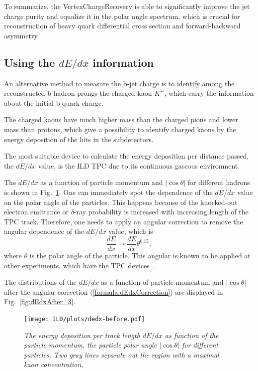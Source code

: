 To summarize, the VertexChargeRecovery is able to significantly improve the jet charge purity and equalize it in the polar angle spectrum, which is crucial for reconstruction of heavy quark differential cross section and forward-backward asymmetry. 
\subsection{Using the $dE/dx$ information}

An alternative method to measure the b-jet charge is to identify among the reconstructed b-hadron prongs the charged kaon $K^\pm$, which carry the information about the initial b-quark charge. 

The charged kaons have much higher mass than the charged pions and lower mass than protons, which give a possibility to identify charged kaons by the energy deposition of the hits in the subdetectors. 

The most suitable device to calculate the energy deposition per distance passed, the $dE/dx$ value, is the ILD TPC due to its continuous gaseous environment. 


The $dE/dx$ as a function of particle momentum and $|\cos\theta|$ for different hadrons is shown in Fig.~\ref{fig:dEdxBefore_3}. One can immediately spot the dependence of the $dE/dx$ value on the polar angle of the particles. This happens because of the knocked-out electron emittance or $\delta$-ray probability is increased with increasing length of the TPC track. Therefore, one needs to apply an angular correction to remove the angular dependence of the $dE/dx$ value, which is 
\begin{equation}
	\frac{dE}{dx}\to\frac{dE}{dx}\theta^{0.15},
    \label{formula:dEdxCorrection}
\end{equation}
where $\theta$ is the polar angle of the particle. 
This angular is known to be applied at other experiments, which have the TPC devices~\cite{bib:HARP}.

The distributions of the $dE/dx$ as a function of particle momentum and $|\cos\theta|$ after the angular correction (\ref{formula:dEdxCorrection}) are displayed in Fig.~\ref{fig:dEdxAfter_3}.
\begin{figure}[h]
{\centering
    \texttt{[image: ILD/plots/dedx-before.pdf]}
    \caption{\sl The energy deposition per track length $dE/dx$ as function of the particle momentum, the particle polar angle $|\cos\theta|$ for different particles. Two gray lines separate out the region with a maximal kaon concentration. 
    }
    \label{fig:dEdxBefore_3}
  }
\end{figure}

